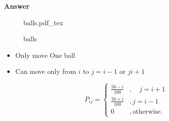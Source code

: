 \documentclass{article}
\newcommand{\incfig}[2][1]{%
\def\svgwidth{#1\columnwidth}
{#2.pdf_tex} } \pdfsuppresswarningpagegroup=1
\theoremstyle{remark}
\begin{document}
   \textbf{Answer} 
 
\begin{figure}[ht]
    \centering
    \incfig{balls}
    \caption{balls}
    \label{fig:balls}
\end{figure}

\begin{itemize}
  \item Only move One ball
  \item Can move only from $i$ to $ j = i-1$ or  $j i +1$
\end{itemize}
\[
P_{ij} = \begin{cases}
  \frac{50 -i}{ 100 }   & , \quad  j = i+1 \\
   \frac{50+i}{100}   & , j = i-1 \\
   0  & , \text{otherwise}.
\end{cases}
\] 

\end{document}
